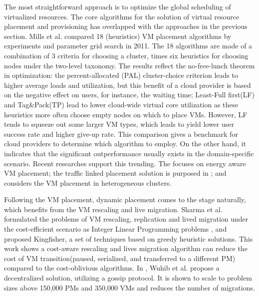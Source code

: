 \documentclass[sigchi]{acmart}
\begin{document}
The most straightforward approach is to optimize the global scheduling of virtualized resources.
The core algorithms for the solution of virtual resource placement and provisioning has overlapped with the approaches in the previous section.
Mills et al. compared 18 (heuristics) VM placement algorithms by experiments and parameter grid search\cite{mills2011comparing} in 2011.
The 18 algorithms are made of a combination of 3 criteria for choosing a cluster, times six heuristics for choosing nodes under the two-level taxonomy.
The results reflect the no-free-lunch theorem in optimization: the percent-allocated (PAL) cluster-choice criterion leads to higher average loads and utilization, but this benefit of a cloud provider is based on the negative effect on users, for instance, the waiting time; 
Least-Full first(LF) and Tag\&Pack(TP) lead to lower cloud-wide virtual core utilization as these heuristics more often choose empty nodes on which to place VMs. However, LF  tends to squeeze out some larger VM types, which leads to yield lower user success rate and higher give-up rate.
This comparison gives a benchmark for cloud providers to determine which algorithm to employ. On the other hand, it indicates that the significant outperformance usually exists in the domain-specific scenario.
Recent researches support this trending. The \cite{moges2019energy} focuses on energy aware VM placement; the traffic linked placement solution is purposed in \cite{liwei2020online}; and \cite{kim2019holistic} considers the VM placement in heterogeneous clusters.

Following the VM placement, dynamic placement comes to the stage naturally, which benefits from the VM rescaling and live migration.
Sharma et al. \cite{5961733}\cite{5935016} formulated the problems of VM rescaling, replication and lived migration under the cost-efficient scenario as Integer Linear Programming problems
, and proposed Kingfisher, a set of techniques based on greedy heuristic solutions.
This work shows a cost-aware rescaling and lives migration algorithm can reduce the cost of VM transition(paused, serialized, and transferred to a different PM) compared to the cost-oblivious algorithms.
In \cite{6172596}, Wuhib et al. propose a decentralized solution, utilizing a gossip protocol. It is shown to scale to problem sizes above 150,000 PMs and 350,000 VMs and reduces the number of migrations.
\end{document}
